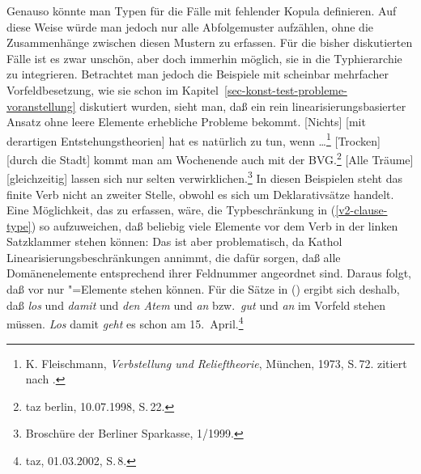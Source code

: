 Genauso könnte man Typen für die Fälle mit fehlender Kopula definieren. Auf diese Weise würde
man jedoch nur alle Abfolgemuster aufzählen, ohne die Zusammenhänge zwischen diesen Mustern
zu erfassen. Für die bisher diskutierten Fälle ist es zwar unschön, aber doch immerhin
möglich, sie in die Typhierarchie zu integrieren. Betrachtet man jedoch die Beispiele mit scheinbar
mehrfacher Vorfeldbesetzung, wie sie schon im Kapitel~\ref{sec-konst-test-probleme-voranstellung}
diskutiert wurden, sieht man, daß ein rein linearisierungsbasierter Ansatz ohne leere Elemente
erhebliche Probleme bekommt.
\eal
\ex {}[Nichts] [mit  derartigen     Entstehungstheorien] hat es natürlich zu tun, wenn \ldots\footnote{
        K. Fleischmann, {\em Verbstellung und Relieftheorie\/}, München, 1973, S.\,72.
        zitiert nach .}
\label{bsp-nichts-mit-derartigen-udc}
\ex {}[Trocken] [durch   die Stadt] kommt man am     Wochenende auch mit  der BVG.\footnote{
        taz berlin, 10.07.1998, S.\,22.
      }\label{bsp-trocken-durch-die-stadt-udc}
\ex\label{bsp-alle-traeume-udc}
    {}[Alle Träume] [gleichzeitig]  lassen sich nur  selten verwirklichen.\footnote{
        Broschüre der Berliner Sparkasse, 1/1999.
        }
\zl
In diesen Beispielen steht das finite Verb nicht an zweiter Stelle, obwohl es sich um Deklarativsätze
handelt. Eine Möglichkeit, das zu erfassen, wäre, die Typbeschränkung in (\ref{v2-clause-type}) so aufzuweichen,
daß beliebig viele Elemente vor dem Verb in der linken Satzklammer stehen können:
\ea
  \impl {}
\z
Das ist aber problematisch, da Kathol Linearisierungsbeschränkungen annimmt, die dafür sorgen,
daß alle Domänenelemente entsprechend ihrer Feldnummer angeordnet sind. Daraus folgt, daß
vor  nur "=Elemente stehen können. Für die Sätze in () ergibt sich
deshalb, daß \emph{los} und \emph{damit} und \emph{den Atem} und \emph{an} bzw.\ \emph{gut}
und \emph{an} im Vorfeld stehen müssen.
\eal
\label{bsp-particle-vf-udc}
\ex\label{bsp-los-damit-udc} 
\emph{Los} damit \emph{geht} es schon am 15.\ April.\footnote{
        taz, 01.03.2002, S.\,8.%
    }
